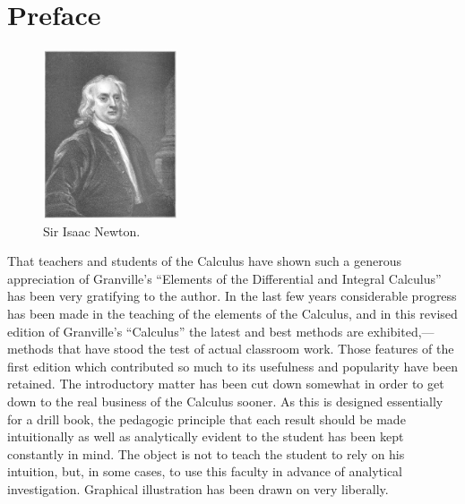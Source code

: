 \chapter{Preface}

\begin{figure}[h]
\begin{minipage}{\textwidth}
\begin{center}
\includegraphics[height=5cm,width=4cm]{images/isaac-newton.eps}
\end{center}
\end{minipage}
\caption{Sir Isaac Newton.}
\label{fig:newton}
\end{figure}

That teachers and students of the Calculus have shown such a 
generous appreciation of Granville's ``Elements of the Differential 
and Integral Calculus'' has been very gratifying to the author. 
In the last few years considerable progress has been made in the 
teaching of the elements of the Calculus, and in this revised 
edition of Granville's ``Calculus'' the latest and best methods 
are exhibited,---methods that have stood the test of actual 
classroom work. Those features of the first edition which 
contributed so much to its usefulness and popularity have been 
retained. The introductory matter has been cut down somewhat in 
order to get down to the real business of the Calculus sooner. 
As this is designed essentially for a drill book, the pedagogic 
principle that each result should be made intuitionally as well 
as analytically evident to the student has been kept constantly 
in mind. The object is not to teach the student to rely on his 
intuition, but, in some cases, to use this faculty in advance 
of analytical investigation. Graphical illustration has been 
drawn on very liberally.

